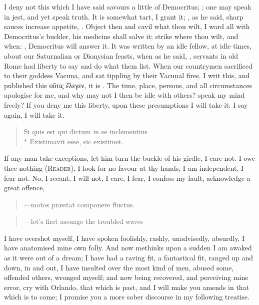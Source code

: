 {I deny not this which I have said savours a little of Democritus; 
; one may speak in jest, and
yet speak truth. It is somewhat tart, I grant it; , as he said, sharp sauces increase appetite,
. Object then and cavil
what thou wilt, I ward all with Democritus's buckler, his medicine
shall salve it; strike where thou wilt, and when: ,
Democritus will answer it. It was written by an idle fellow, at idle
times, about our Saturnalian or Dionysian feasts, when as he said,
, servants in old Rome had liberty to say
and do what them list. When our countrymen sacrificed to their goddess
Vacuna, and sat tippling by their Vacunal fires. I writ this, and
published this \textgreek{οὕτις ἕλεγεν}, it is . The time, place,
persons, and all circumstances apologise for me, and why may not I then
be idle with others? speak my mind freely? If you deny me this liberty,
upon these presumptions I will take it: I say again, I will take it.

\begin{verse}
\textlatin{Si quis est qui dictum in se inclementius}\\*
\textlatin{Existimavit esse, sic existimet.}
\end{verse}

If any man take exceptions, let him turn the buckle of his girdle, I
care not. I owe thee nothing (\textsc{Reader}), I look for no favour at thy
hands, I am independent, I fear not.
No, I recant, I will not, I care, I fear, I confess my fault,
acknowledge a great offence,

\begin{quote}
---\textlatin{motos pr\ae{}stat componere fluctus.}
\end{quote}

\begin{quote}
---let's first assuage the troubled waves
\end{quote}

I have overshot myself, I have spoken foolishly, rashly, unadvisedly,
absurdly, I have anatomised mine own folly. And now methinks upon a
sudden I am awaked as it were out of a dream; I have had a raving fit,
a fantastical fit, ranged up and down, in and out, I have insulted over
the most kind of men, abused some, offended others, wronged myself; and
now being recovered, and perceiving mine error, cry with Orlando,
 that which is past, and I will make you
amends in that which is to come; I promise you a more sober discourse
in my following treatise.

}
